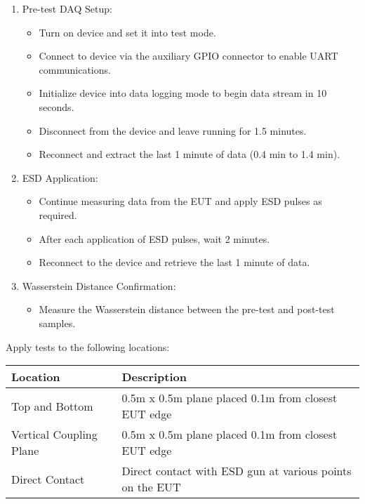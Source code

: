 \documentclass[a4paper,12pt]{article}
\begin{document}


\begin{enumerate}
      \item{Pre-test DAQ Setup:}
            \begin{itemize}
                  \item{Turn on device and set it into test mode.}
                  \item{Connect to device via the auxiliary GPIO connector to enable UART communications.}
                  \item{Initialize device into data logging mode to begin data stream in 10 seconds.}
                  \item{Disconnect from the device and leave running for 1.5 minutes.}
                  \item{Reconnect and extract the last 1 minute of data (0.4 min to 1.4 min).}
            \end{itemize}

      \item{ESD Application:}
            \begin{itemize}
                  \item{Continue measuring data from the EUT and apply ESD pulses as required.}
                  \item{After each application of ESD pulses, wait 2 minutes.}
                  \item{Reconnect to the device and retrieve the last 1 minute of data.}
            \end{itemize}

      \item{Wasserstein Distance Confirmation:}
            \begin{itemize}
                  \item{Measure the Wasserstein distance between the pre-test and post-test samples.}
            \end{itemize}
\end{enumerate}

Apply tests to the following locations:
\begin{center}
      \begin{tabular}{|l|L|}
            \hline
            Location & Description \\
            \hline
            Top and Bottom & 0.5m x 0.5m plane placed 0.1m from closest EUT edge \\
            Vertical Coupling Plane & 0.5m x 0.5m plane placed 0.1m from closest EUT edge \\
            Direct Contact & Direct contact with ESD gun at various points on the EUT \\
            \hline
      \end{tabular}
\end{center}
\end{document}
